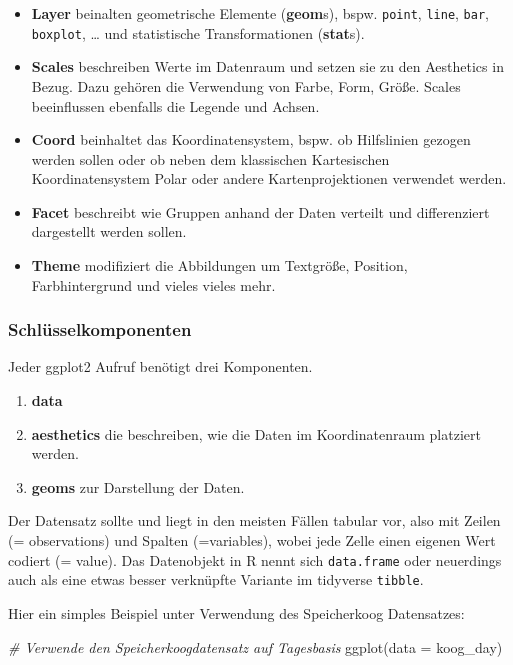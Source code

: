 \documentclass[
]{article}
\newenvironment{Shaded}{\begin{snugshade}}{\end{snugshade}}
\newcommand{\AttributeTok}[1]{\textcolor[rgb]{0.77,0.63,0.00}{#1}}
\newcommand{\CommentTok}[1]{\textcolor[rgb]{0.56,0.35,0.01}{\textit{#1}}}
\newcommand{\FunctionTok}[1]{\textcolor[rgb]{0.00,0.00,0.00}{#1}}
\newcommand{\NormalTok}[1]{#1}
\providecommand{\tightlist}{%
  \setlength{\itemsep}{0pt}\setlength{\parskip}{0pt}}
\begin{document}
\begin{itemize}
\tightlist
\item
  \textbf{Layer} beinalten geometrische Elemente (\textbf{geom}s), bspw. \texttt{point}, \texttt{line}, \texttt{bar}, \texttt{boxplot}, \ldots{} und statistische Transformationen (\textbf{stat}s).
\item
  \textbf{Scales} beschreiben Werte im Datenraum und setzen sie zu den Aesthetics in Bezug. Dazu gehören die Verwendung von Farbe, Form, Größe. Scales beeinflussen ebenfalls die Legende und Achsen.
\item
  \textbf{Coord} beinhaltet das Koordinatensystem, bspw. ob Hilfslinien gezogen werden sollen oder ob neben dem klassischen Kartesischen Koordinatensystem Polar oder andere Kartenprojektionen verwendet werden.
\item
  \textbf{Facet} beschreibt wie Gruppen anhand der Daten verteilt und differenziert dargestellt werden sollen.
\item
  \textbf{Theme} modifiziert die Abbildungen um Textgröße, Position, Farbhintergrund und vieles vieles mehr.
\end{itemize}

\hypertarget{schluxfcsselkomponenten}{%
\subsubsection{Schlüsselkomponenten}\label{schluxfcsselkomponenten}}

Jeder ggplot2 Aufruf benötigt drei Komponenten.

\begin{enumerate}
\def\labelenumi{\arabic{enumi}.}
\tightlist
\item
  \textbf{data}
\item
  \textbf{aesthetics} die beschreiben, wie die Daten im Koordinatenraum platziert werden.
\item
  \textbf{geoms} zur Darstellung der Daten.
\end{enumerate}

Der Datensatz sollte und liegt in den meisten Fällen tabular vor, also mit Zeilen (= observations) und Spalten (=variables), wobei jede Zelle einen eigenen Wert codiert (= value). Das Datenobjekt in R nennt sich \texttt{data.frame} oder neuerdings auch als eine etwas besser verknüpfte Variante im tidyverse \texttt{tibble}.

Hier ein simples Beispiel unter Verwendung des Speicherkoog Datensatzes:

\begin{Shaded}
\begin{Highlighting}[]
\CommentTok{\# Verwende den Speicherkoogdatensatz auf Tagesbasis}
\FunctionTok{ggplot}\NormalTok{(}\AttributeTok{data =}\NormalTok{ koog\_day)}
\end{Highlighting}
\end{Shaded}
\end{document}
